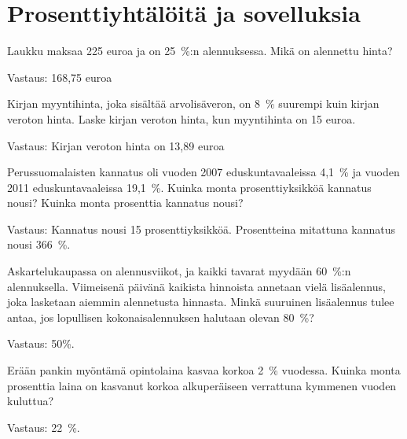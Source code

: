 \section{Prosenttiyhtälöitä ja sovelluksia}

\begin{tehtava}
    Laukku maksaa 225 euroa ja on 25~\%:n alennuksessa. Mikä on alennettu hinta?
    
    \begin{vastaus}
    Vastaus: 168,75 euroa
    \end{vastaus}
\end{tehtava}

\begin{tehtava}
    Kirjan myyntihinta, joka sisältää arvolisäveron, on 8~\% suurempi kuin kirjan
    veroton hinta. Laske kirjan veroton hinta, kun myyntihinta on 15 euroa.
    
    \begin{vastaus}
        Vastaus: Kirjan veroton hinta on 13,89 euroa
    \end{vastaus}
\end{tehtava}

\begin{tehtava}
    Perussuomalaisten kannatus oli vuoden 2007 eduskuntavaaleissa 4,1~\% ja
    vuoden 2011 eduskuntavaaleissa 19,1~\%. Kuinka monta prosenttiyksikköä kannatus nousi? Kuinka monta prosenttia kannatus nousi?
    \begin{vastaus}
    Vastaus: Kannatus nousi 15 prosenttiyksikköä. Prosentteina mitattuna
    kannatus nousi 366~\%.
    \end{vastaus}
\end{tehtava}

\begin{tehtava}
    Askartelukaupassa on alennusviikot, ja kaikki tavarat myydään 60~\%:n alennuksella. Viimeisenä päivänä kaikista hinnoista annetaan 
    vielä lisäalennus, joka lasketaan aiemmin alennetusta hinnasta. Minkä suuruinen lisäalennus tulee antaa, jos lopullisen 
    kokonaisalennuksen halutaan olevan 80~\%?

    \begin{vastaus}
        Vastaus: 50\%.
    \end{vastaus}
\end{tehtava}

\begin{tehtava}
    Erään pankin myöntämä opintolaina kasvaa korkoa 2~\% vuodessa. Kuinka monta prosenttia laina on kasvanut korkoa alkuperäiseen 
    verrattuna kymmenen vuoden kuluttua?

    \begin{vastaus}
        Vastaus: 22~\%.
    \end{vastaus}
\end{tehtava}

